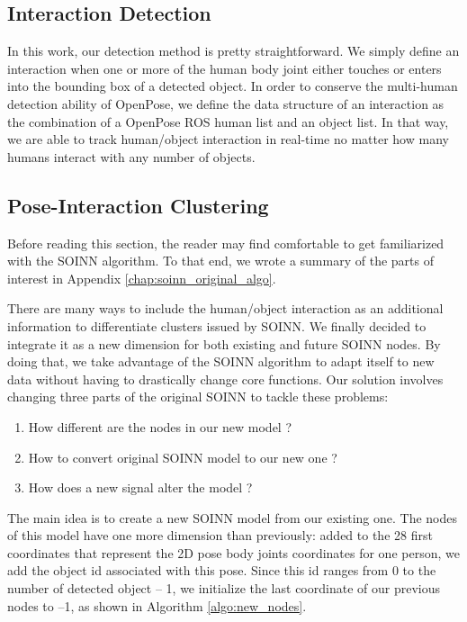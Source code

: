 \subsection{Interaction Detection}
In this work, our detection method is pretty straightforward. We simply define an interaction when one or more of the human body joint either touches or enters into the bounding box of a detected object. In order to conserve the multi-human detection ability of OpenPose, we define the data structure of an interaction as the combination of a OpenPose ROS human list and an object list. In that way, we are able to track human/object interaction in real-time no matter how many humans interact with any number of objects.

\subsection{Pose-Interaction Clustering}
\label{section:pose-interaction_clustering}
Before reading this section, the reader may find comfortable to get familiarized with the SOINN algorithm. To that end, we wrote a summary of the parts of interest in Appendix \ref{chap:soinn_original_algo}.


There are many ways to include the human/object interaction as an additional information to differentiate clusters issued by SOINN. We finally decided to integrate it as a new dimension for both existing and future SOINN nodes. By doing that, we take advantage of the SOINN algorithm to adapt itself to new data without having to drastically change core functions. Our solution involves changing three parts of the original SOINN to tackle these problems:

\begin{enumerate}
    \item{How different are the nodes in our new model ?}
    \item{How to convert original SOINN model to our new one ?}
    \item{How does a new signal alter the model ?}
\end{enumerate}

The main idea is to create a new SOINN model from our existing one. The nodes of this model have one more dimension than previously: added to the 28 first coordinates that represent the 2D pose body joints coordinates for one person, we add the object id associated with this pose. Since this id ranges from 0 to the number of detected object -- 1, we initialize the last coordinate of our previous nodes to --1, as shown in Algorithm \ref{algo:new_nodes}.

